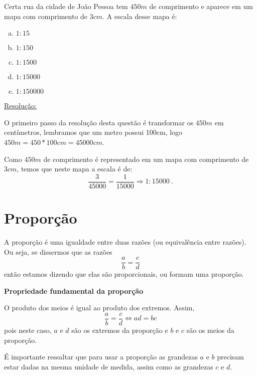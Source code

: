 \begin{exem}[FGV - 2014]
Certa rua da cidade de João Pessoa tem $450 m$ de comprimento e aparece em um mapa com comprimento de $3 cm$. A escala desse mapa é:
\begin{multicols}{5}
\begin{enumerate}[a)]
 \item $1:15$
 \item $1:150$
 \item $1:1500$
 \item $1:15000$
 \item $1:150000$
\end{enumerate}
\end{multicols}
\underline{Resolução:}

O primeiro passo da resolução desta questão é transformar os $450m$ em centímetros, lembramos que um metro possui 100cm, logo $450 m=450*100 cm= 45000 cm$.

Como $450 m$ de comprimento é representado em um mapa com comprimento de $3 cm$, temos que neste mapa a escala é de:
\[\frac{3}{45000}= \frac{1}{15000} \Rightarrow 1:15000 \ .\]

 \fim
\end{exem}


\section{Proporção}

A proporção é uma igualdade entre duas razões (ou equivalência entre razões). Ou seja, se dissermos que as razões
\[\frac{a}{b}= \frac{c}{d}\]
então estamos dizendo que elas são proporcionais, ou formam uma proporção.

\vskip0.3cm

\colorbox{azul}{
 \begin{minipage}{0.9\linewidth}
 \begin{center}
 \textbf{Propriedade fundamental da proporção}

   O produto dos meios é igual ao produto dos extremos. Assim,
 \[\frac{a}{b}= \frac{c}{d} \Leftrightarrow ad= bc\]
 pois neste caso, $a$ e $d$ são os extremos da proporção e $b$ e $c$ são os meios da proporção.
 \end{center}
 \end{minipage}}

 \vskip0.3cm

É importante ressaltar que para usar a proporção as grandezas $a$ e $b$ precisam estar dadas na mesma unidade de medida, assim como as grandezas $c$ e $d$.

